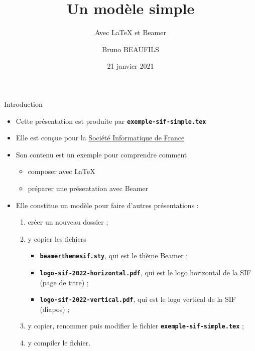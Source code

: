 \documentclass[10pt,t]{beamer}
\title[SIF]{Un modèle simple}
\subtitle{Avec \LaTeX{} et Beamer}
\author{Bruno BEAUFILS}
\institute[]{GT Moyens Informatiques}
\date{21 janvier 2021}
\begin{document}
\maketitle


\begin{frame}{Introduction} 

  \begin{itemize}
  \item Cette présentation est produite par \texttt{\textbf{exemple-sif-simple.tex}}
  \item Elle est conçue pour la \href{https://www.societe-informatique-de-france.fr}{Société Informatique de France}
  \item Son contenu est un exemple pour comprendre comment

    \begin{itemize}
    \item composer avec \LaTeX{}
    \item préparer une présentation avec Beamer
    \end{itemize}

  \end{itemize}

  \pause


  \begin{itemize}
  \item Elle constitue un modèle pour faire d'autres présentations :
      
    \begin{enumerate}
    \item créer un nouveau dossier ;
    \item y copier les fichiers 
      
      \begin{itemize}
      \item \texttt{\textbf{beamerthemesif.sty}}, qui est le thème Beamer ;
      \item \texttt{\textbf{logo-sif-2022-horizontal.pdf}}, qui est le logo horizontal de la SIF (page de titre) ;
      \item \texttt{\textbf{logo-sif-2022-vertical.pdf}}, qui est le logo vertical de la SIF (diapos) ;
      \end{itemize}
      
    \item y copier, renommer puis modifier le fichier \texttt{\textbf{exemple-sif-simple.tex}} ;
    \item y compiler le fichier.
    \end{enumerate}
  \end{itemize}
\end{frame}
\end{document}
